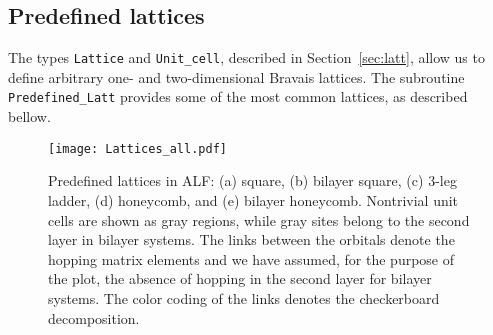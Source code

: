 %
\subsection{Predefined lattices} \label{sec:predefined_lattices}


The types \texttt{Lattice} and \texttt{Unit\_cell}, described in Section~\ref{sec:latt}, allow us to define arbitrary one- and two-dimensional Bravais lattices. The subroutine \texttt{Predefined\_Latt} provides some of the most common lattices, as described bellow.

\begin{figure}
        \begin{center}
                \texttt{[image: Lattices\_all.pdf]}
                \caption{Predefined lattices in ALF: (a) square, (b) bilayer square, (c) 3-leg ladder, (d) honeycomb, and (e) bilayer honeycomb. Nontrivial unit cells are shown as gray regions, while gray sites belong to the second layer in bilayer systems.   The links between the orbitals denote the hopping matrix elements and we have assumed, for the purpose of the plot, the absence of hopping in the second layer for bilayer systems. The color coding of the links denotes the checkerboard decomposition.}
                \label{fig_predefined_lattices}
        \end{center}
\end{figure}

